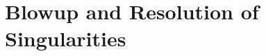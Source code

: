 \documentclass[12pt, a4paper, oneside]{book}
\theoremstyle{plain}
\newtheorem{theorem}{Theorem}[chapter]
\theoremstyle{definition}
\theoremstyle{remark}
\theoremstyle{definition}
\begin{document}

\section{Blowup and Resolution of Singularities}
\end{document}
